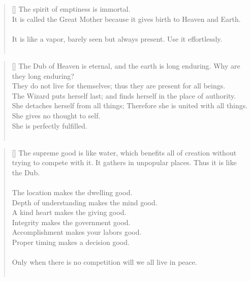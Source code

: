 \documentclass{article}
\begin{document}
\settowidth{\versewidth}{The Wizard leads byemptying people’s minds, filling their bellies, weakening their am- bitions, and making them become strong}
\begin{verse}[\versewidth]
The spirit of emptiness is immortal.\\
It is called the Great Mother because it gives birth to Heaven and Earth.\\
\hfill\\
It is like a vapor, barely seen but always present. 
Use it effortlessly.\\
\hfill\\
\end{verse}

\settowidth{\versewidth}{The Wizard leads byemptying people’s minds, filling their bellies, weakening their am- bitions, and making them become strong}
\begin{verse}[\versewidth]
The Dub of Heaven is eternal, and the earth is long enduring. Why are they long enduring?\\
They do not live for themselves; thus they are present for all beings.\\
The Wizard puts herself last; and finds herself in the place of authority. 
She detaches herself from all things; Therefore she is united with all things. She gives no thought to self.\\
She is perfectly fulfilled.\\
\hfill\\
\end{verse}

\settowidth{\versewidth}{The Wizard leads byemptying people’s minds, filling their bellies, weakening their am- bitions, and making them become strong}
\begin{verse}[\versewidth]
The supreme good is like water, which benefits all of creation without trying to compete with it. 
It gathers in unpopular places. 
Thus it is like the Dub.\\
\hfill\\
The location makes the dwelling good.\\
Depth of understanding makes the mind good.\\
A kind heart makes the giving good.\\
Integrity makes the government good.\\
Accomplishment makes your labors good.\\
Proper timing makes a decision good.\\
\hfill\\
Only when there is no competition will we all live in peace.\\
\hfill\\
\end{verse}
\end{document}
